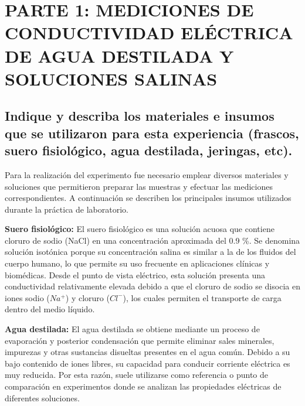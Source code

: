 \documentclass[a4paper,openany,12pt]{book}
\begin{document}
\maketitle

\tableofcontents 
\listoftables 
{}
\listoffigures 
{}

\setlength{\tabcolsep}{6pt} 
\renewcommand{\arraystretch}{1}
\clearpage
{}
%
\section{PARTE 1: MEDICIONES DE CONDUCTIVIDAD ELÉCTRICA DE AGUA DESTILADA Y SOLUCIONES SALINAS} 


\subsection{Indique y describa los materiales e insumos que se utilizaron para esta experiencia (frascos,
	suero fisiológico, agua destilada, jeringas, etc).}



Para la realización del experimento fue necesario emplear diversos materiales
y soluciones que permitieron preparar las muestras y efectuar las mediciones
correspondientes. A continuación se describen los principales insumos
utilizados durante la práctica de laboratorio.

\textbf{Suero fisiológico:}  
El suero fisiológico es una solución acuosa que contiene cloruro de sodio
(NaCl) en una concentración aproximada del 0.9 \%. Se denomina solución
isotónica porque su concentración salina es similar a la de los fluidos del
cuerpo humano, lo que permite su uso frecuente en aplicaciones clínicas y
biomédicas. Desde el punto de vista eléctrico, esta solución presenta una
conductividad relativamente elevada debido a que el cloruro de sodio se
disocia en iones sodio ($Na^+$) y cloruro ($Cl^-$), los cuales permiten el
transporte de carga dentro del medio líquido.

\textbf{Agua destilada:}  
El agua destilada se obtiene mediante un proceso de evaporación y posterior
condensación que permite eliminar sales minerales, impurezas y otras
sustancias disueltas presentes en el agua común. Debido a su bajo contenido de
iones libres, su capacidad para conducir corriente eléctrica es muy reducida.
Por esta razón, suele utilizarse como referencia o punto de comparación en
experimentos donde se analizan las propiedades eléctricas de diferentes
soluciones.
\end{document}
